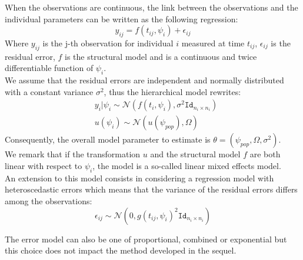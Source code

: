 \documentclass[a4paper]{article}
\theoremstyle{plain}
\theoremstyle{plain}
\theoremstyle{definition}
\begin{document}
When the observations are continuous, the link between the observations and the individual parameters can be written as the following regression:
\begin{equation}\label{continuousmodel}
y_{ij} = f(t_{ij},\psi_i) + \epsilon_{ij}
\end{equation}
Where $y_{ij}$ is the j-th observation for individual $i$ measured at time $t_{ij}$, $\epsilon_{ij}$ is the residual error, $f$ is the structural model and is a continuous and twice differentiable function of $\psi_i$.\\
We assume that the residual errors are independent and normally distributed with a constant variance $\sigma^2$, thus the hierarchical model rewrites:
\begin{equation}
\begin{split}
& y_i|\psi_i \sim \mathcal{N}(f(t_i,\psi_i),\sigma^2\texttt{Id}_{n_i\times n_i})\\
& u(\psi_i) \sim \mathcal{N}(u(\psi_{pop}),\Omega)
\end{split}
\end{equation}
Consequently, the overall model parameter to estimate is $\theta= (\psi_{pop}, \Omega, \sigma^2)$.\\
We remark that if the transformation $u$ and the structural model $f$ are both linear with respect to $\psi_i$, the model is a so-called linear mixed effects model.\\
An extension to this model consists in considering a regression model with heteroscedastic errors which means that the variance of the residual errors differs among the observations:
\begin{equation}
\epsilon_{ij} \sim \mathcal{N}(0,g(t_{ij}, \psi_i)^2\texttt{Id}_{n_i\times n_i})
\end{equation}

The error model can also be one of proportional, combined or exponential \cite{comets} but this choice does not impact the method developed in the sequel.
\end{document}
